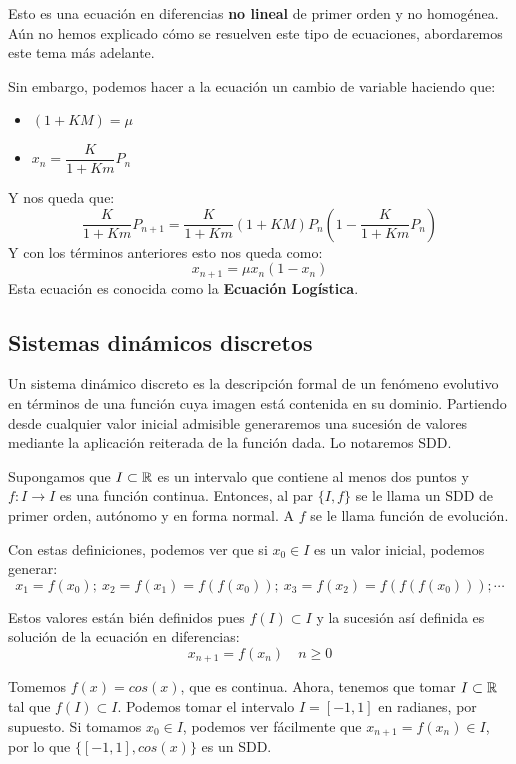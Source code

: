 Esto es una ecuación en diferencias \textbf{no lineal} de primer orden y no homogénea. Aún no hemos explicado cómo se resuelven este tipo de ecuaciones, abordaremos este tema más adelante.

Sin embargo, podemos hacer a la ecuación un cambio de variable haciendo que:
\begin{itemize}
	\item $(1+KM) = \mu$
	\item $x_n = \dfrac{K}{1+Km}P_n$
\end{itemize}
Y nos queda que:
\[
\dfrac{K}{1+Km}P_{n+1} = \dfrac{K}{1+Km}(1+KM)P_n ( 1 - \dfrac{K}{1+Km}P_n)
\]
Y con los términos anteriores esto nos queda como:
\[
x_{n+1} = \mu x_n(1-x_n)
\]
Esta ecuación es conocida como la \textbf{Ecuación Logística}.

\subsection{Sistemas dinámicos discretos}

\begin{ndef}
	Un sistema dinámico discreto es la descripción formal de un fenómeno evolutivo en términos de una función cuya imagen está contenida en su dominio. Partiendo desde cualquier valor inicial admisible generaremos una sucesión de valores mediante la aplicación reiterada de la función dada. Lo notaremos SDD.
\end{ndef}

\begin{ndef}
	Supongamos que $I \subset \mathbb{R}$ es un intervalo que contiene al menos dos puntos y $f:I \to I$ es una función continua. Entonces, al par $\{I,f\}$ se le llama un SDD de primer orden, autónomo y en forma normal. A $f$ se le llama función de evolución.
\end{ndef}

Con estas definiciones, podemos ver que si $x_0 \in I$ es un valor inicial, podemos generar:
\[
x_1 = f(x_0); \ x_2 = f(x_1) = f(f(x_0)); \ x_3 = f(x_2) = f(f(f(x_0))); \cdots
\]

Estos valores están bién definidos pues $f(I) \subset I$ y la sucesión así definida es solución de la ecuación en diferencias:
\[
x_{n+1} = f(x_n) \quad n \geq 0
\]
\begin{ejemplo}
	Tomemos $f(x) = cos(x)$, que es continua. Ahora, tenemos que tomar $I \subset \mathbb{R}$ tal que $f(I) \subset I$. Podemos tomar el intervalo $I=[-1,1]$ en radianes, por supuesto.
	Si tomamos $x_0\in I$, podemos ver fácilmente que $x_{n+1}=f(x_n) \in I$, por lo que $\{[-1,1],cos(x)\}$ es un SDD.
\end{ejemplo}

